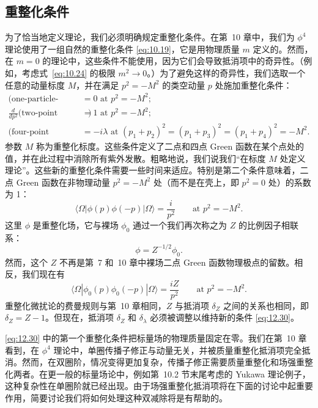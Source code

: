 \subsection{重整化条件}

为了恰当地定义理论，我们必须明确规定重整化条件。在第~10 章中，我们为 $\phi^4$ 理论使用了一组自然的重整化条件 \eqref{eq:10.19}，它是用物理质量 $m$ 定义的。然而，在 $m = 0$ 的理论中，这些条件不能使用，因为它们会导致抵消项中的奇异性。（例如，考虑式~\eqref{eq:10.24} 的极限 $m^2\to 0$。）为了避免这样的奇异性，我们选取一个任意的动量标度 $M$，并在满足 $p^2 = -M^2$ 的类空动量 $p$ 处施加重整化条件：
\begin{equation}
  \begin{aligned}
    \text{(one-particle-irreducible two-point function)} &= 0
      \text{ at } p^2 = -M^2;\\
    \frac{d}{dp^2}\bigl( \text{two-point function} \bigr) &= 1
      \text{ at } p^2 = -M^2;\\
    \text{(four-point function)} &= -i\lambda
      \text{ at } (p_1+p_2)^2 = (p_1+p_3)^2 = (p_1+p_4)^2 = -M^2 .
  \end{aligned}
  \label{eq:12.30}
\end{equation}
参数 $M$ 称为重整化标度。这些条件定义了二点和四点 Green 函数在某个点处的值，并在此过程中消除所有紫外发散。粗略地说，我们说我们``在标度 $M$ 处定义理论''。这些新的重整化条件需要一些时间来适应。特别是第二个条件意味着，二点 Green 函数在非物理动量 $p^2 = -M^2$ 处（而不是在壳上，即 $p^2 = 0$ 处）的系数为 1：
\begin{equation}
  \langle\Omega|\phi(p)\phi(-p)|\Omega\rangle = \frac{i}{p^2}
  \qquad\text{at } p^2 = -M^2 .
\end{equation}
这里 $\phi$ 是重整化场，它与裸场 $\phi_0$ 通过一个我们再次称之为 $Z$ 的比例因子相联系：
\begin{equation}
  \phi = Z^{-1/2}\phi_0 .
  \label{eq:12.31}
\end{equation}
然而，这个 $Z$ 不再是第~7 和~10 章中裸场二点 Green 函数物理极点的留数。相反，我们现在有
\begin{equation}
  \langle\Omega|\phi_0(p)\phi_0(-p)|\Omega\rangle = \frac{iZ}{p^2}
  \qquad\text{at } p^2 = -M^2 .
\end{equation}
重整化微扰论的费曼规则与第~10 章相同，$Z$ 与抵消项 $\delta_Z$ 之间的关系也相同，即 $\delta_Z = Z - 1$。但现在，抵消项 $\delta_Z$ 和 $\delta_\lambda$ 必须被调整以维持新的条件 \eqref{eq:12.30}。

\eqref{eq:12.30} 中的第一个重整化条件把标量场的物理质量固定在零。我们在第~10 章看到，在 $\phi^4$ 理论中，单圈传播子修正与动量无关，并被质量重整化抵消项完全抵消。然而，在双圈阶，情况变得更加复杂，传播子修正需要质量重整化和场强重整化两者。在更一般的标量场论中，例如第~10.2 节末尾考虑的 Yukawa 理论例子，这种复杂性在单圈阶就已经出现。由于场强重整化抵消项将在下面的讨论中起重要作用，简要讨论我们将如何处理这种双减除将是有帮助的。

